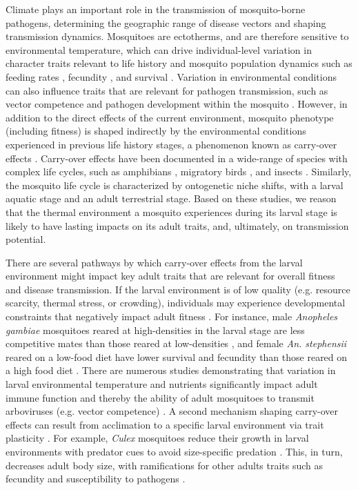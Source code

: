 \documentclass[12pt]{article}
\begin{document}
Climate plays an important role in the transmission of mosquito-borne pathogens, determining the geographic range of disease vectors and shaping transmission dynamics. Mosquitoes are ectotherms, and are therefore sensitive to environmental temperature, which can drive individual-level variation in character traits relevant to life history and mosquito population dynamics such as feeding rates \citep{delatte2009}, fecundity \citep{yang2009}, and survival \citep{alto2001}. Variation in environmental conditions can also influence traits that are relevant for pathogen transmission, such as vector competence and pathogen development within the mosquito \citep{lambrechts2011}. However, in addition to the direct effects of the current environment, mosquito phenotype (including fitness) is shaped indirectly by the environmental conditions experienced in previous life history stages, a phenomenon known as carry-over effects \citep{harrison2011}. Carry-over effects have been documented in a wide-range of species with complex life cycles, such as amphibians \citep{vonesh2005}, migratory birds \citep{norris2006}, and insects \citep{deblock2005a, roux2015a}. Similarly, the mosquito life cycle is characterized by ontogenetic niche shifts, with a larval aquatic stage and an adult terrestrial stage. Based on these studies, we reason that the thermal environment a mosquito experiences during its larval stage is likely to have lasting impacts on its adult traits, and, ultimately, on transmission potential.

There are several pathways by which carry-over effects from the larval environment might impact key adult traits that are relevant for overall fitness and disease transmission. If the larval environment is of low quality (e.g. resource scarcity, thermal stress, or crowding), individuals may experience developmental constraints that negatively impact adult fitness \citep{inger2010}. For instance, male \textit{Anopheles gambiae} mosquitoes reared at high-densities in the larval stage are less competitive mates than those reared at low-densities \citep{nghabi2005}, and female \textit{An. stephensii} reared on a low-food diet have lower survival and fecundity than those reared on a high food diet \citep{moller-jacobs2014, shapiro2016}. There are numerous studies demonstrating that variation in larval environmental temperature and nutrients significantly impact adult immune function \citep{muturi2012, price2015} and thereby the ability of adult mosquitoes to transmit arboviruses (e.g. vector competence) \citep{grimstad1991, muturi2012a, muturi2011d, alto2013, vantaux2016, buckner2016}. A second mechanism shaping carry-over effects can result from acclimation to a specific larval environment via trait plasticity \citep{monaghan2008}. For example, \textit{Culex} mosquitoes reduce their growth in larval environments with predator cues to avoid size-specific predation \citep{jourdan2016}. This, in turn, decreases adult body size, with ramifications for other adults traits such as fecundity \citep{lounibos2002} and susceptibility to pathogens \citep{paulson1991}.
\end{document}
